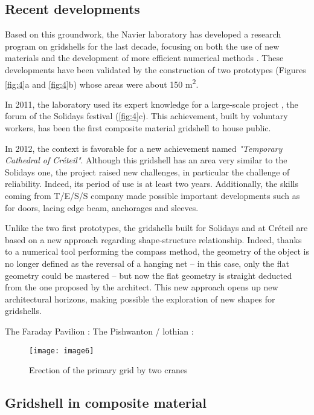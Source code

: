 \subsection{Recent developments}
Based on this groundwork, the Navier laboratory has developed a research program on gridshells for the last decade, focusing on both the use of new materials and the development of more efficient numerical methods \citep{Douthe2007}. These developments have been validated by the construction of two prototypes (Figures \ref{fig:4}a and \ref{fig:4}b) whose areas were about 150 m\textsuperscript{2}.


In 2011, the laboratory used its expert knowledge for a large-scale project \citep{Baverel2012}, the forum of the Solidays festival (\autoref{fig:4}c). This achievement, built by voluntary workers, has been the first composite material gridshell to house public.

In 2012, the context is favorable for a new achievement named \emph{"Temporary Cathedral of Créteil"}. Although this gridshell has an area very similar to the Solidays one, the project raised new challenges, in particular the challenge of reliability. Indeed, its period of use is at least two years. Additionally, the skills coming from T/E/S/S company made possible important developments such as for doors, lacing edge beam, anchorages and sleeves.

Unlike the two first prototypes, the gridshells built for Solidays and at Créteil are based on a new approach regarding shape-structure relationship. Indeed, thanks to a numerical tool performing the compass method, the geometry of the object is no longer defined as the reversal of a hanging net – in this case, only the flat geometry could be mastered \citep{Addis2013} – but now the flat geometry is straight deducted from the one proposed by the architect.
This new approach opens up new architectural horizons, making possible the exploration of new shapes for gridshells.

The Faraday Pavilion : \cite{Nicholas2013}
The Pishwanton / lothian : \cite{Pishwanton2003}

\begin{figure}[t]
	\centering
		\texttt{[image: image6]}
	\caption{Erection of the primary grid by two cranes}
	\label{fig:5}
\end{figure}


\subsection{Gridshell in composite material}

